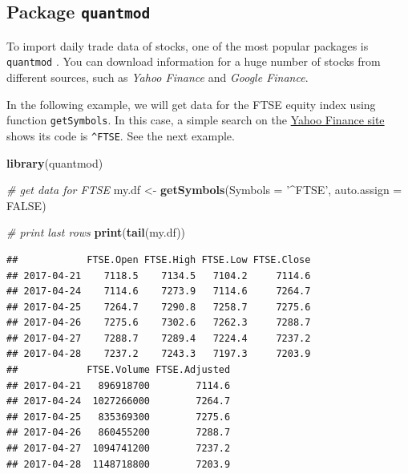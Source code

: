 \documentclass[11pt,]{book}
\newenvironment{Shaded}{\begin{snugshade}}{\end{snugshade}}
\newcommand{\KeywordTok}[1]{\textcolor[rgb]{0.27,0.27,0.27}{\textbf{#1}}}
\newcommand{\DataTypeTok}[1]{\textcolor[rgb]{0.27,0.27,0.27}{#1}}
\newcommand{\StringTok}[1]{\textcolor[rgb]{0.5,0.5,0.5}{#1}}
\newcommand{\CommentTok}[1]{\textcolor[rgb]{0.56,0.35,0.01}{\textit{#1}}}
\newcommand{\OtherTok}[1]{\textcolor[rgb]{0.56,0.35,0.01}{#1}}
\newcommand{\NormalTok}[1]{#1}
\begin{document}
\subsection{\texorpdfstring{Package
\texttt{quantmod}}{Package quantmod}}\label{package-quantmod}

To import daily trade data of stocks, one of the most popular packages
is \texttt{quantmod} \citep{quantmod2015}. You can download information
for a huge number of stocks from different sources, such as \emph{Yahoo
Finance} and \emph{Google Finance}. 

In the following example, we will get data for the FTSE equity index
using function \texttt{getSymbols}. In this case, a simple search on the
\href{https://finance.yahoo.com/}{Yahoo Finance site} shows its code is
\texttt{\^{}FTSE}. See the next example. 

\begin{Shaded}
\begin{Highlighting}[]
\KeywordTok{library}\NormalTok{(quantmod)}

\CommentTok{# get data for FTSE}
\NormalTok{my.df <-}\StringTok{ }\KeywordTok{getSymbols}\NormalTok{(}\DataTypeTok{Symbols =} \StringTok{'^FTSE'}\NormalTok{, }\DataTypeTok{auto.assign =} \OtherTok{FALSE}\NormalTok{)}

\CommentTok{# print last rows}
\KeywordTok{print}\NormalTok{(}\KeywordTok{tail}\NormalTok{(my.df))}
\end{Highlighting}
\end{Shaded}

\begin{verbatim}
##            FTSE.Open FTSE.High FTSE.Low FTSE.Close
## 2017-04-21    7118.5    7134.5   7104.2     7114.6
## 2017-04-24    7114.6    7273.9   7114.6     7264.7
## 2017-04-25    7264.7    7290.8   7258.7     7275.6
## 2017-04-26    7275.6    7302.6   7262.3     7288.7
## 2017-04-27    7288.7    7289.4   7224.4     7237.2
## 2017-04-28    7237.2    7243.3   7197.3     7203.9
##            FTSE.Volume FTSE.Adjusted
## 2017-04-21   896918700        7114.6
## 2017-04-24  1027266000        7264.7
## 2017-04-25   835369300        7275.6
## 2017-04-26   860455200        7288.7
## 2017-04-27  1094741200        7237.2
## 2017-04-28  1148718800        7203.9
\end{verbatim}
\end{document}
